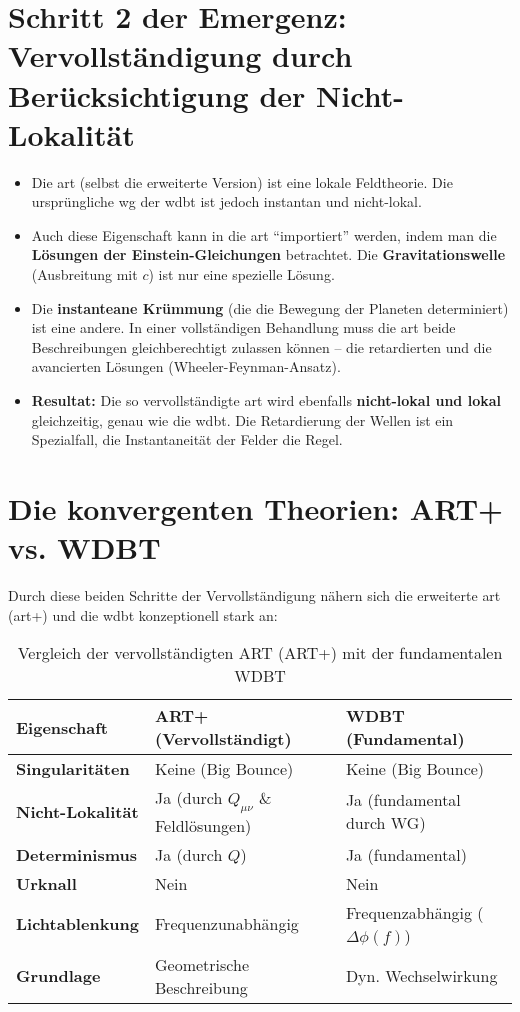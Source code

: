 \section{Schritt 2 der Emergenz: Vervollständigung durch Berücksichtigung der Nicht-Lokalität}

\begin{itemize}
    \item Die \gls{art} (selbst die erweiterte Version) ist eine lokale Feldtheorie. Die ursprüngliche \gls{wg} der \gls{wdbt} ist jedoch instantan und nicht-lokal.
    \item Auch diese Eigenschaft kann in die \gls{art} \enquote{importiert} werden, indem man die \textbf{Lösungen der Einstein-Gleichungen} betrachtet. Die \textbf{Gravitationswelle} (Ausbreitung mit $c$) ist nur eine spezielle Lösung.
    \item Die \textbf{instanteane Krümmung} (die die Bewegung der Planeten determiniert) ist eine andere. In einer vollständigen Behandlung muss die \gls{art} beide Beschreibungen gleichberechtigt zulassen können – die retardierten und die avancierten Lösungen (Wheeler-Feynman-Ansatz).
    \item \textbf{Resultat:} Die so vervollständigte \gls{art} wird ebenfalls \textbf{nicht-lokal und lokal} gleichzeitig, genau wie die \gls{wdbt}. Die Retardierung der Wellen ist ein Spezialfall, die Instantaneität der Felder die Regel.
\end{itemize}

\section{Die konvergenten Theorien: ART+ vs. WDBT}
Durch diese beiden Schritte der Vervollständigung nähern sich die erweiterte \gls{art} (\gls{art}+) und die \gls{wdbt} konzeptionell stark an:

\begin{table}[h]
\centering
\begin{tabular}{|p{}|p{}|p{}|}
\hline
\textbf{Eigenschaft} & \textbf{ART+ (Vervollständigt)} & \textbf{WDBT (Fundamental)} \\
\hline
\textbf{Singularitäten} & Keine (Big Bounce) & Keine (Big Bounce) \\
\hline
\textbf{Nicht-Lokalität} & Ja (durch $Q_{\mu\nu}$ \& Feldlösungen) & Ja (fundamental durch WG) \\
\hline
\textbf{Determinismus} & Ja (durch $Q$) & Ja (fundamental) \\
\hline
\textbf{Urknall} & Nein & Nein \\
\hline
\textbf{Lichtablenkung} & Frequenzunabhängig & Frequenzabhängig ($\Delta \phi(f)$) \\
\hline
\textbf{Grundlage} & Geometrische Beschreibung & Dyn. Wechselwirkung \\
\hline
\end{tabular}
\caption{Vergleich der vervollständigten ART (ART+) mit der fundamentalen WDBT}
\end{table}

